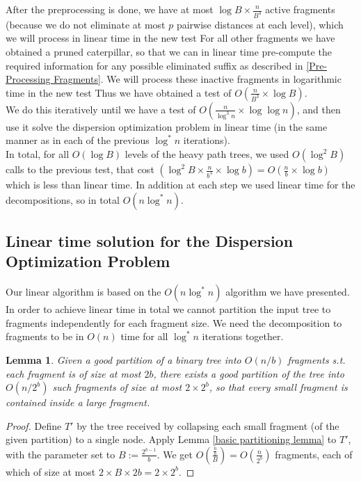 \documentclass[11pt,a4paper]{article}
\newtheorem{lemma}{Lemma}
\theoremstyle{definition}
\theoremstyle{remark}
\begin{document}
After the preprocessing is done, we have at most $\log B \times \frac{n}{B^4}$ active fragments (because we do not eliminate at most $p$ pairwise distances at each level), which we will process in linear time in the new test For all other fragments we have obtained a pruned caterpillar, so that we can in linear time pre-compute the required information for any possible eliminated suffix as described in \ref{Pre-Processing Fragments}. We will process these inactive fragments in logarithmic time in the new test Thus we have obtained a test of $O(\frac{n}{B^3} \times \log B)$.\\
We do this iteratively until we have a test of $O(\frac{n}{\log ^3n} \times \log \log n)$, and then use it solve the dispersion optimization problem in linear time (in the same manner as in each of the previous $\log ^*n$ iterations).\\
In total, for all $O(\log B)$ levels of the heavy path trees, we used $O(\log ^2B)$ calls to the previous test, that cost $(\log ^2B \times \frac{n}{b^3} \times \log b)=O(\frac{n}{b} \times \log b)$ which is less than linear time. In addition at each step we used linear time for the decompositions, so in total $O(n \log ^*n)$. 

\subsection{Linear time solution for the Dispersion Optimization Problem}
Our linear algorithm is based on the $O(n \log ^*n)$ algorithm we have presented. In order to achieve linear time in total we cannot partition the input tree to fragments independently for each fragment size. We need the decomposition to fragments to be in $O(n)$ time for all $\log ^*n$ iterations together.
\begin{lemma}
Given a good partition of a binary tree into $O(n/b)$ fragments s.t. each fragment is of size at most $2b$, there exists a good partition of the tree into $O(n/2^b)$ such fragments of size at most $2 \times 2^b$, so that every small fragment is contained inside a large fragment.
\end{lemma}
\begin{proof}
Define $T'$ by the tree received by collapsing each small fragment (of the given partition) to a single node. Apply Lemma \ref{basic partitioning lemma} to $T'$, with the parameter set to $B:= \frac{2^{b-1}}{b}$. We get $O(\frac{\frac{n}{b}}{B})=O(\frac{n}{2^b})$ fragments, each of which of size at most $2 \times B \times 2b = 2 \times 2^b$.
\end{proof}
\end{document}
